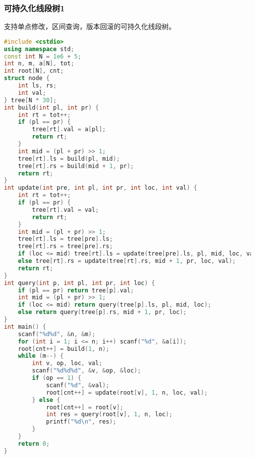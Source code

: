 \documentclass[9pt, a4paper, oneside]{book}
\begin{document}
\subsubsection{可持久化线段树1}
支持单点修改，区间查询，版本回滚的可持久化线段树。
\begin{lstlisting}[language={C++}]
#include <cstdio>
using namespace std;
const int N = 1e6 + 5;
int n, m, a[N], tot;
int root[N], cnt;
struct node {
    int ls, rs;
    int val;
} tree[N * 30];
int build(int pl, int pr) {
    int rt = tot++;
    if (pl == pr) {
        tree[rt].val = a[pl];
        return rt;
    }
    int mid = (pl + pr) >> 1;
    tree[rt].ls = build(pl, mid);
    tree[rt].rs = build(mid + 1, pr);
    return rt;
}
int update(int pre, int pl, int pr, int loc, int val) {
    int rt = tot++;
    if (pl == pr) {
        tree[rt].val = val;
        return rt;
    }
    int mid = (pl + pr) >> 1;
    tree[rt].ls = tree[pre].ls;
    tree[rt].rs = tree[pre].rs;
    if (loc <= mid) tree[rt].ls = update(tree[pre].ls, pl, mid, loc, val);
    else tree[rt].rs = update(tree[rt].rs, mid + 1, pr, loc, val);
    return rt;
}
int query(int p, int pl, int pr, int loc) {
    if (pl == pr) return tree[p].val;
    int mid = (pl + pr) >> 1;
    if (loc <= mid) return query(tree[p].ls, pl, mid, loc);
    else return query(tree[p].rs, mid + 1, pr, loc);
}
int main() {
    scanf("%d%d", &n, &m);
    for (int i = 1; i <= n; i++) scanf("%d", &a[i]);
    root[cnt++] = build(1, n);
    while (m--) {
        int v, op, loc, val;
        scanf("%d%d%d", &v, &op, &loc);
        if (op == 1) {
            scanf("%d", &val);
            root[cnt++] = update(root[v], 1, n, loc, val);
        } else {
            root[cnt++] = root[v];
            int res = query(root[v], 1, n, loc);
            printf("%d\n", res);
        }
    }
    return 0;
}\end{lstlisting}
\end{document}
